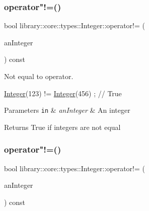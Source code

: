 \mbox{\label{classlibrary_1_1core_1_1types_1_1Integer_a9145ffb6bca8771f06a3403056466d53}} 
\subsubsection{\texorpdfstring{operator"!=()}{operator!=()}\hspace{0.1cm}{\footnotesize\ttfamily [1/2]}}
{\footnotesize\ttfamily bool library\+::core\+::types\+::\+Integer\+::operator!= (\begin{DoxyParamCaption}\item[{const \hyperlink{classlibrary_1_1core_1_1types_1_1Integer}{Integer} \&}]{an\+Integer }\end{DoxyParamCaption}) const}



Not equal to operator. 


\begin{DoxyCode}
\hyperlink{classlibrary_1_1core_1_1types_1_1Integer_a6483b1c4e13e5ed6af5e7a58347efead}{Integer}(123) != \hyperlink{classlibrary_1_1core_1_1types_1_1Integer_a6483b1c4e13e5ed6af5e7a58347efead}{Integer}(456) ; \textcolor{comment}{// True}
\end{DoxyCode}



\begin{DoxyParams}[1]{Parameters}
\mbox{\tt in}  & {\em an\+Integer} & An integer \\
\hline
\end{DoxyParams}
\begin{DoxyReturn}{Returns}
True if integers are not equal 
\end{DoxyReturn}
\mbox{\label{classlibrary_1_1core_1_1types_1_1Integer_a9c3c4e9564a3a8da5133207f3197d3a3}} 
\subsubsection{\texorpdfstring{operator"!=()}{operator!=()}\hspace{0.1cm}{\footnotesize\ttfamily [2/2]}}
{\footnotesize\ttfamily bool library\+::core\+::types\+::\+Integer\+::operator!= (\begin{DoxyParamCaption}\item[{const \hyperlink{classlibrary_1_1core_1_1types_1_1Integer_a623afb1580f870fd8a1997b1c12c917d}{Integer\+::\+Value\+Type} \&}]{an\+Integer }\end{DoxyParamCaption}) const}

